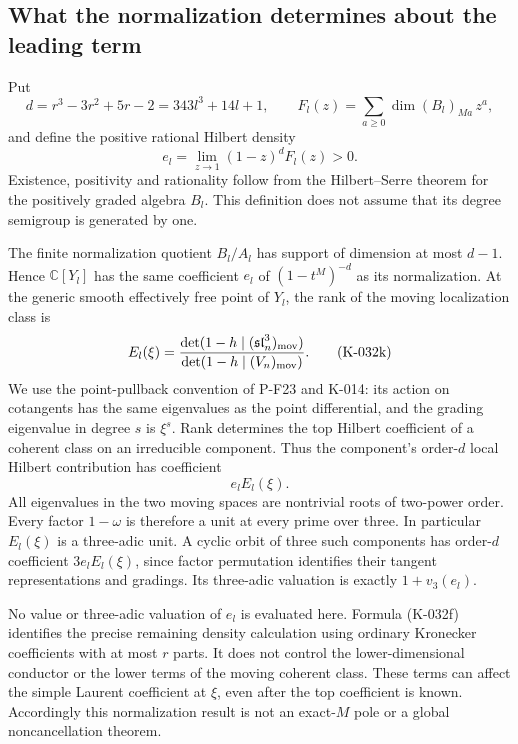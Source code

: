 \subsection*{What the normalization determines about the leading term}

Put
\[
 d=r^3-3r^2+5r-2=343l^3+14l+1,\qquad
 F_l(z)=\sum_{a\ge0}\dim(B_l)_{Ma}\,z^a,
\]
and define the positive rational Hilbert density
\[
                   e_l=\lim_{z\to1}(1-z)^d F_l(z)>0.
                                                        \tag{K-032j}
\]
Existence, positivity and rationality follow from the Hilbert--Serre
theorem for the positively graded algebra $B_l$.  This definition
does not assume that its degree semigroup is generated by one.

The finite normalization quotient $B_l/A_l$ has support of dimension
at most $d-1$.  Hence $\mathbb C[Y_l]$ has the same coefficient $e_l$
of $(1-t^M)^{-d}$ as its normalization.  At the generic smooth
effectively free point of $Y_l$, the rank of the moving localization
class is
\[
 E_l(\xi)=
 \frac{\det(1-h\mid (\mathfrak{sl}_n^3)_{\rm mov})}
      {\det(1-h\mid (V_n)_{\rm mov})}.                 \tag{K-032k}
\]
We use the point-pullback convention of P-F23 and K-014: its action
on cotangents has the same eigenvalues as the point differential,
and the grading eigenvalue in degree $s$ is $\xi^s$.
Rank determines the top Hilbert coefficient of a coherent class on
an irreducible component.  Thus the component's order-$d$ local
Hilbert contribution has coefficient
\[
                              e_l E_l(\xi).           \tag{K-032l}
\]
All eigenvalues in the two moving spaces are nontrivial roots of
two-power order.  Every factor $1-\omega$ is therefore a unit at
every prime over three.  In particular $E_l(\xi)$ is a three-adic
unit.  A cyclic orbit of three such components has order-$d$
coefficient $3e_lE_l(\xi)$, since factor permutation identifies
their tangent representations and gradings.  Its three-adic
valuation is exactly $1+v_3(e_l)$.

No value or three-adic valuation of $e_l$ is evaluated here.  Formula
(K-032f) identifies the precise remaining density calculation using
ordinary Kronecker coefficients with at most $r$ parts.  It does not
control the lower-dimensional conductor or the lower terms of the
moving coherent class.  These terms can affect the simple Laurent
coefficient at $\xi$, even after the top coefficient is known.
Accordingly this normalization result is not an exact-$M$ pole or a
global noncancellation theorem.


